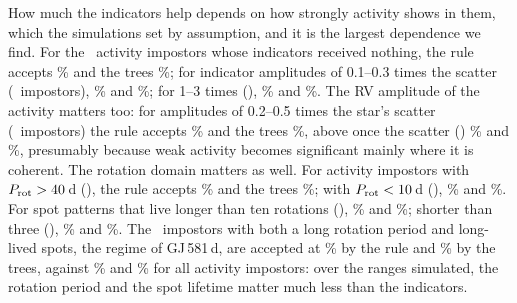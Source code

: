 How much the indicators help depends on how strongly activity shows in them, which the
simulations set by assumption, and it is the largest dependence we find. For the \nmStNUnc\ activity impostors whose indicators
received nothing, the rule accepts \nmStRuleUnc\% and the trees \nmStTreeUnc\%; for
indicator amplitudes of 0.1--0.3 times the scatter (\nmStNWeak\ impostors), \nmStRuleWeak\%
and \nmStTreeWeak\%; for 1--3 times (\nmStNStrong), \nmStRuleStrong\% and \nmStTreeStrong\%.
The RV amplitude of the activity matters too: for amplitudes of 0.2--0.5 times the
star's scatter (\nmAmpLoN\ impostors) the rule accepts \nmAmpLoRule\% and the trees
\nmAmpLoTree\%, above once the scatter (\nmAmpHiN) \nmAmpHiRule\% and \nmAmpHiTree\%,
presumably because weak activity becomes significant mainly where it is coherent.
The rotation domain matters as well. For activity impostors with $P_{\rm rot} > 40$\,d
(\nmDomProtLongN), the rule accepts \nmDomProtLongRule\% and the trees
\nmDomProtLongTree\%; with $P_{\rm rot} < 10$\,d (\nmDomProtShortN), \nmDomProtShortRule\%
and \nmDomProtShortTree\%. For spot patterns that live longer than ten rotations
(\nmDomLamLongN), \nmDomLamLongRule\% and \nmDomLamLongTree\%; shorter than three
(\nmDomLamShortN), \nmDomLamShortRule\% and \nmDomLamShortTree\%. The \nmDomBothN\
impostors with both a long rotation period and long-lived spots, the regime of
GJ\,581\,d, are accepted at \nmDomBothRule\% by the rule and \nmDomBothTree\% by the trees,
against \nmRuleAccAct\% and \nmTreeAccAct\% for all activity impostors: over the ranges
simulated, the rotation period and the spot lifetime matter much less than the
indicators.
